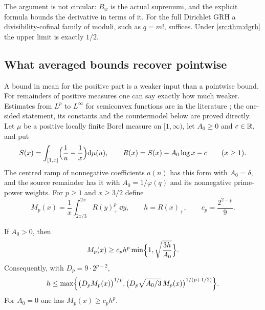 The argument is not circular: $B_w$ is the actual supremum, and the explicit formula bounds
the derivative in terms of it. For the full Dirichlet GRH a divisibility-cofinal family of
moduli, such as $q=m!$, suffices. Under \cref{src:thm:dgrh} the upper limit is exactly $1/2$.

\subsection{What averaged bounds recover pointwise}\label{ana:sec:mpt}
{\raggedright{}}

A bound in mean for the positive part is a weaker input than a pointwise bound. For
remainders of positive measures one can say exactly how much weaker. Estimates from $L^p$ to
$L^\infty$ for semiconvex functions are in the literature
\cite[Proposition~8.2]{BragaFigalliMoreira2019Optimal}; the one-sided statement, its constants
and the countermodel below are proved directly. Let $\mu$ be a positive
locally finite Borel measure on $[1,\infty)$, let $A_0\ge0$ and $c\in\mathbb{R}$, and put
\begin{equation}\label{ana:eq:posramp}
 S(x)=\int_{[1,x]}\Bigl(\frac1u-\frac1x\Bigr)\mathrm{d}\mu(u),\qquad
 R(x)=S(x)-A_0\log x-c\qquad(x\ge1).
\end{equation}
The centred ramp of nonnegative coefficients $a(n)$ has this form with $A_0=\delta$, and the
source remainder has it with $A_0=1/\varphi(q)$ and its nonnegative prime-power weights. For
$p\ge1$ and $x\ge3/2$ define
\[
 M_p(x)=\frac1x\int_{2x/3}^{2x}R(y)_+^p\,\dd y,\qquad h=R(x)_+,\qquad c_p=\frac{2^{2-p}}9 .
\]

\begin{theorem}\label{ana:thm:mpt}
If $A_0>0$, then
\begin{equation}\label{ana:eq:mptmass}
 M_p(x)\ge c_ph^p\min\Bigl\{1,\sqrt{\frac{3h}{A_0}}\Bigr\}.
\end{equation}
Consequently, with $D_p=9\cdot2^{p-2}$,
\begin{equation}\label{ana:eq:mptpoint}
 h\le\max\Bigl\{\bigl(D_pM_p(x)\bigr)^{1/p},
 \bigl(D_p\sqrt{A_0/3}\,M_p(x)\bigr)^{1/(p+1/2)}\Bigr\}.
\end{equation}
For $A_0=0$ one has $M_p(x)\ge c_ph^p$.
\end{theorem}

